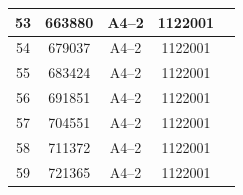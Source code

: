 \documentclass[UTF8,10pt,a4paper,fontset=fandol]{ctexart}
\newcommand{\fieldvalue}[1]{#1}
\begin{document}
\begin{center}
\begin{tabular}{|c|c|c|c|c|}
\fieldvalue{53} &
\fieldvalue{663880} &
\fieldvalue{A4--2} &
\fieldvalue{1122001} & \\ \hline

\fieldvalue{54} &
\fieldvalue{679037} &
\fieldvalue{A4--2} &
\fieldvalue{1122001} & \\ \hline

\fieldvalue{55} &
\fieldvalue{683424} &
\fieldvalue{A4--2} &
\fieldvalue{1122001} & \\ \hline

\fieldvalue{56} &
\fieldvalue{691851} &
\fieldvalue{A4--2} &
\fieldvalue{1122001} & \\ \hline

\fieldvalue{57} &
\fieldvalue{704551} &
\fieldvalue{A4--2} &
\fieldvalue{1122001} & \\ \hline

\fieldvalue{58} &
\fieldvalue{711372} &
\fieldvalue{A4--2} &
\fieldvalue{1122001} & \\ \hline

\fieldvalue{59} &
\fieldvalue{721365} &
\fieldvalue{A4--2} &
\fieldvalue{1122001} & \\ \hline


\end{tabular}
\end{center}
\end{document}
